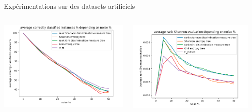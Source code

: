 \documentclass[usenames,dvipsnames]{beamer}
\begin{document}
\begin{frame}{Expérimentations sur des datasets artificiels}
    \begin{columns}
        \begin{column}{0.5\textwidth}
            \centering
            \includegraphics[width=\textwidth]{acc_5.png}
        \end{column}
        \begin{column}{0.5\textwidth}
            \centering
            \includegraphics[width=\textwidth]{shannon_eval_5.png}
        \end{column}
    \end{columns}
\end{frame}
\end{document}
